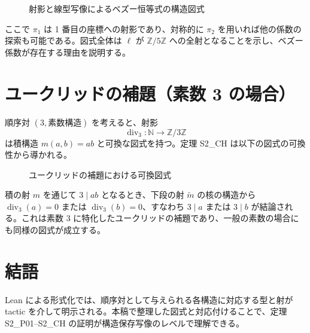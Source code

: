 \documentclass{ltjsarticle}
\begin{document}
\begin{figure}[htbp]
  \centering
  \caption{射影と線型写像によるベズー恒等式の構造図式}
\end{figure}

ここで $\pi_1$ は 1 番目の座標への射影であり、対称的に $\pi_2$ を用いれば他の係数の探索も可能である。図式全体は $\ell$ が $\mathbb{Z}/5\mathbb{Z}$ への全射となることを示し、ベズー係数が存在する理由を説明する。

\section{ユークリッドの補題（素数 3 の場合）}
順序対 $(3, \text{素数構造})$ を考えると、射影
\[
\operatorname{div}_3 : \mathbb{N} \to \mathbb{Z}/3\mathbb{Z}
\]
は積構造 $m(a,b) = ab$ と可換な図式を持つ。定理 S2\_CH は以下の図式の可換性から導かれる。

\begin{figure}[htbp]
  \centering
  \caption{ユークリッドの補題における可換図式}
\end{figure}

積の射 $m$ を通じて $3 \mid ab$ となるとき、下段の射 $\tilde{m}$ の核の構造から $\operatorname{div}_3(a)=0$ または $\operatorname{div}_3(b)=0$、すなわち $3 \mid a$ または $3 \mid b$ が結論される。これは素数 3 に特化したユークリッドの補題であり、一般の素数の場合にも同様の図式が成立する。

\section*{結語}
Lean による形式化では、順序対として与えられる各構造に対応する型と射が tactic を介して明示される。本稿で整理した図式と対応付けることで、定理 S2\_P01--S2\_CH の証明が構造保存写像のレベルで理解できる。
\end{document}
